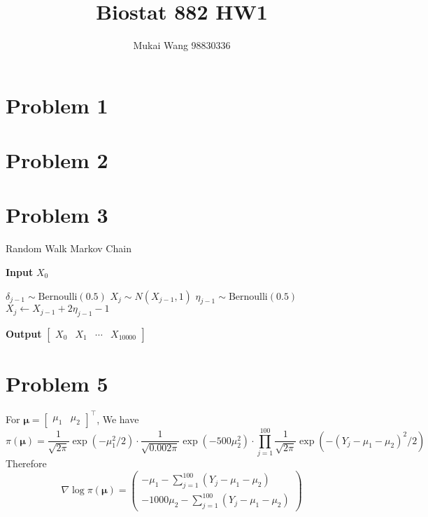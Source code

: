 \documentclass[12pt]{article}
\title{Biostat 882 HW1}
\date{}
\author{Mukai Wang 98830336}
\begin{document}
\maketitle


\section*{Problem 1}



\section*{Problem 2}


\section*{Problem 3}

\begin{algorithm}
	\caption{Random Walk Markov Chain}\label{RWMC}
	\hspace*{\algorithmicindent} \textbf{Input} $X_0$
	\begin{algorithmic}[1]
		\State $\delta_{j-1} \sim \text{Bernoulli}(0.5)$
			\State $X_j \sim N(X_{j-1}, 1)$
		\Else
			\State $\eta_{j-1} \sim \text{Bernoulli}(0.5)$
			\State $X_j \gets X_{j-1} + 2\eta_{j-1} - 1$
		\EndIf
		\EndFor
	\end{algorithmic}
	\hspace*{\algorithmicindent} \textbf{Output} $\begin{bmatrix}X_0 & X_1 & \cdots &X_{10000} \end{bmatrix}$
\end{algorithm}


\section*{Problem 5}
 For $\bm{\mu} = \begin{bmatrix}\mu_1 & \mu_2\end{bmatrix}^\top$, We have 
 \[ \pi (\bm{\mu}) = \frac{1}{\sqrt{2\pi}} \exp\left( -\mu_1^2/2\right)\cdot \frac{1}{\sqrt{0.002\pi}}\exp\left( -500\mu_2^2\right)\cdot \prod_{j=1}^{100}\frac{1}{\sqrt{2\pi}} \exp \left(-(Y_j - \mu_1 - \mu_2)^2 / 2 \right)  \] 
Therefore
\[ \nabla \log \pi(\bm{\mu}) = \begin{pmatrix}
	-\mu_1 - \sum_{j=1}^{100}(Y_j - \mu_1 - \mu_2) \\
	-1000 \mu_2 - \sum_{j=1}^{100}(Y_j - \mu_1 - \mu_2)
 \end{pmatrix} \]
\end{document}
